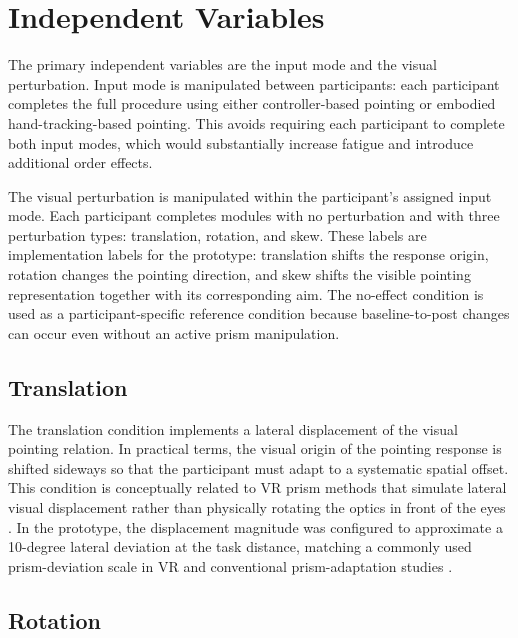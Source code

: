 \section{Independent Variables}
\label{sec:method-independent-variables}

The primary independent variables are the input mode and the visual perturbation. Input mode is manipulated between participants: each participant completes the full procedure using either controller-based pointing or embodied hand-tracking-based pointing. This avoids requiring each participant to complete both input modes, which would substantially increase fatigue and introduce additional order effects.

The visual perturbation is manipulated within the participant's assigned input mode. Each participant completes modules with no perturbation and with three perturbation types: translation, rotation, and skew. These labels are implementation labels for the prototype: translation shifts the response origin, rotation changes the pointing direction, and skew shifts the visible pointing representation together with its corresponding aim. The no-effect condition is used as a participant-specific reference condition because baseline-to-post changes can occur even without an active prism manipulation.

\subsection{Translation}
\label{subsec:method-translation}

The translation condition implements a lateral displacement of the visual pointing relation. In practical terms, the visual origin of the pointing response is shifted sideways so that the participant must adapt to a systematic spatial offset. This condition is conceptually related to VR prism methods that simulate lateral visual displacement rather than physically rotating the optics in front of the eyes \cite{Ramos2019,anan2025comparative}. In the prototype, the displacement magnitude was configured to approximate a 10-degree lateral deviation at the task distance, matching a commonly used prism-deviation scale in VR and conventional prism-adaptation studies \cite{Ramos2019,Serino2011}.

\subsection{Rotation}
\label{subsec:method-rotation}

